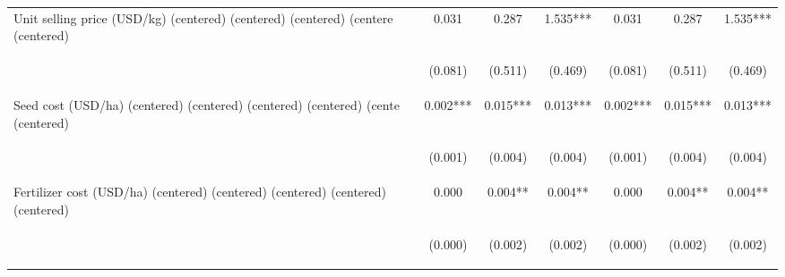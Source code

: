 \begin{center}
\begin{tabular}{lcccccc}
Unit selling price (USD/kg) (centered) (centered) (centered) (centere (centered) & 0.031 & 0.287 & 1.535*** & 0.031 & 0.287 & 1.535*** \\
\vspace{4pt} & \begin{footnotesize}(0.081)\end{footnotesize} & \begin{footnotesize}(0.511)\end{footnotesize} & \begin{footnotesize}(0.469)\end{footnotesize} & \begin{footnotesize}(0.081)\end{footnotesize} & \begin{footnotesize}(0.511)\end{footnotesize} & \begin{footnotesize}(0.469)\end{footnotesize} \\
Seed cost (USD/ha) (centered) (centered) (centered) (centered) (cente (centered) & 0.002*** & 0.015*** & 0.013*** & 0.002*** & 0.015*** & 0.013*** \\
\vspace{4pt} & \begin{footnotesize}(0.001)\end{footnotesize} & \begin{footnotesize}(0.004)\end{footnotesize} & \begin{footnotesize}(0.004)\end{footnotesize} & \begin{footnotesize}(0.001)\end{footnotesize} & \begin{footnotesize}(0.004)\end{footnotesize} & \begin{footnotesize}(0.004)\end{footnotesize} \\
Fertilizer cost (USD/ha) (centered) (centered) (centered) (centered)  (centered) & 0.000 & 0.004** & 0.004** & 0.000 & 0.004** & 0.004** \\
\vspace{4pt} & \begin{footnotesize}(0.000)\end{footnotesize} & \begin{footnotesize}(0.002)\end{footnotesize} & \begin{footnotesize}(0.002)\end{footnotesize} & \begin{footnotesize}(0.000)\end{footnotesize} & \begin{footnotesize}(0.002)\end{footnotesize} & \begin{footnotesize}(0.002)\end{footnotesize} \\

\end{tabular}
\end{center}
